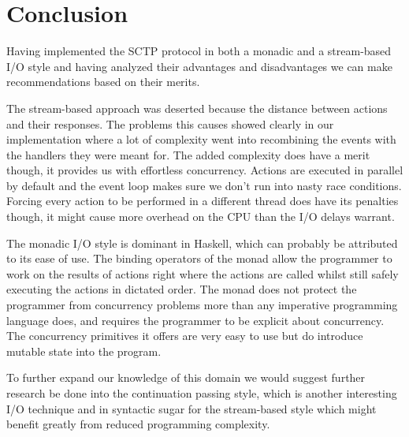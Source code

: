 \chapter{Conclusion}
Having implemented the SCTP protocol in both a monadic and a stream-based I/O style and having analyzed their advantages and disadvantages we can make recommendations based on their merits.

The stream-based approach was deserted because the distance between actions and their responses. The problems this causes showed clearly in our implementation where a lot of complexity went into recombining the events with the handlers they were meant for. 
The added complexity does have a merit though, it provides us with effortless concurrency. Actions are executed in parallel by default and the event loop makes sure we don't run into nasty race conditions.
Forcing every action to be performed in a different thread does have its penalties though, it might cause more overhead on the CPU than the I/O delays warrant.

The monadic I/O style is dominant in Haskell, which can probably be attributed to its ease of use. The binding operators of the monad allow the programmer to work on the results of actions right where the actions are called whilst still safely executing the actions in dictated order.
The monad does not protect the programmer from concurrency problems more than any imperative programming language does, and requires the programmer to be explicit about concurrency. The concurrency primitives it offers are very easy to use but do introduce mutable state into the program.

To further expand our knowledge of this domain we would suggest further research be done into the continuation passing style, which is another interesting I/O technique and in syntactic sugar for the stream-based style which might benefit greatly from reduced programming complexity.
